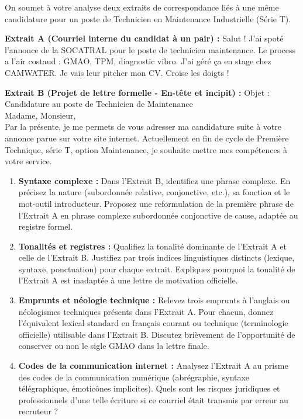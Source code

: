 \documentclass[11pt]{article}
\begin{document}
\begin{exercice}
On soumet à votre analyse deux extraits de correspondance liés à une même candidature pour un poste de Technicien en Maintenance Industrielle (Série T).

\textbf{Extrait A (Courriel interne du candidat à un pair) :} \og Salut ! J'ai spoté l'annonce de la SOCATRAL pour le poste de technicien maintenance. Le process a l'air costaud : GMAO, TPM, diagnostic vibro. J'ai géré ça en stage chez CAMWATER. Je vais leur pitcher mon CV. Croise les doigts ! \fg{}

\textbf{Extrait B (Projet de lettre formelle - En-tête et incipit) :} \og Objet : Candidature au poste de Technicien de Maintenance\\
Madame, Monsieur,\\
Par la présente, je me permets de vous adresser ma candidature suite à votre annonce parue sur votre site internet. Actuellement en fin de cycle de Première Technique, série T, option Maintenance, je souhaite mettre mes compétences à votre service. \fg{}

\begin{enumerate}
    \item \textbf{Syntaxe complexe :} Dans l'Extrait B, identifiez une phrase complexe. En précisez la nature (subordonnée relative, conjonctive, etc.), sa fonction et le mot-outil introducteur. Proposez une reformulation de la première phrase de l'Extrait A en phrase complexe subordonnée conjonctive de cause, adaptée au registre formel.
    \item \textbf{Tonalités et registres :} Qualifiez la tonalité dominante de l'Extrait A et celle de l'Extrait B. Justifiez par trois indices linguistiques distincts (lexique, syntaxe, ponctuation) pour chaque extrait. Expliquez pourquoi la tonalité de l'Extrait A est inadaptée à une lettre de motivation officielle.
    \item \textbf{Emprunts et néologie technique :} Relevez trois emprunts à l'anglais ou néologismes techniques présents dans l'Extrait A. Pour chacun, donnez l'équivalent lexical standard en français courant ou technique (terminologie officielle) utilisable dans l'Extrait B. Discutez brièvement de l'opportunité de conserver ou non le sigle \og GMAO \fg{} dans la lettre finale.
    \item \textbf{Codes de la communication internet :} Analysez l'Extrait A au prisme des codes de la communication numérique (abrégraphie, syntaxe télégraphique, émoticônes implicites). Quels sont les risques juridiques et professionnels d'une telle écriture si ce courriel était transmis par erreur au recruteur ?
\end{enumerate}
\end{exercice}
\end{document}

